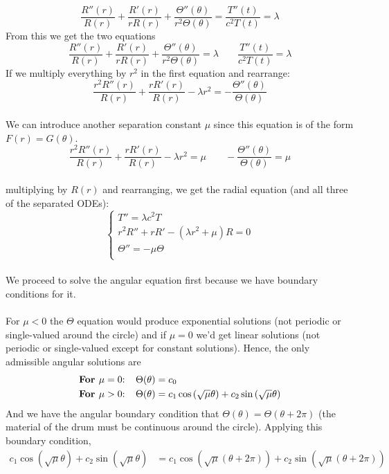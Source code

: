 \documentclass[12pt]{article}
\begin{document}
\begin{enumerate}[(a)]
{$$\frac{R''(r)}{R(r)} + \frac{R'(r)}{r R(r)} + \frac{\Theta''(\theta)}{r^2 \Theta(\theta)} = \frac{T''(t) }{c^2 T(t)} = \lambda$$
From this we get the two equations
$$\frac{R''(r)}{R(r)} + \frac{R'(r)}{r R(r)} + \frac{\Theta''(\theta)}{r^2 \Theta(\theta)}  = \lambda \;\;\;\;\;\;\; \frac{T''(t) }{c^2 T(t)} = \lambda$$
If we multiply everything by $r^2$ in the first equation and rearrange:
$$\frac{r^2R''(r)}{R(r)} + \frac{rR'(r)}{ R(r)} -  \lambda r^2  = -\frac{\Theta''(\theta)}{\Theta(\theta)} $$ \\
We can introduce another separation constant $\mu$ since this equation is of the form $F(r) = G(\theta)$.
$$\frac{r^2R''(r)}{R(r)} + \frac{rR'(r)}{ R(r)} -  \lambda r^2 = \mu  \;\;\;\;\;\;\; -\frac{\Theta''(\theta)}{\Theta(\theta)} = \mu $$ \\
multiplying by $R(r)$ and rearranging, we get the radial equation (and all three of the separated ODEs):
$$\begin{cases}
T'' = \lambda c^2 T \\
r^2 R'' + rR' -  (\lambda r^2 + \mu) R = 0 \\
\Theta'' = -\mu \Theta \\
\end{cases}$$ \\
We proceed to solve the angular equation first because we have boundary conditions for it. \\ \\
For $\mu < 0$ the $\Theta$ equation would produce exponential solutions (not periodic or single-valued around the circle) and if $\mu = 0$ we'd get linear solutions (not periodic or single-valued except for constant solutions). Hence, the only admissible angular solutions are \\
\begin{align*}
\text{\textbf{For $\mu = 0$}:} &\;\;\;\; \Theta(\theta) = c_0 \\
\text{\textbf{For $\mu > 0$}:} &\;\;\;\; \Theta(\theta) = c_1 \cos \left( \sqrt{\mu} \theta \right) + c_2 \sin \left( \sqrt{\mu} \theta \right) \\
\end{align*}
And we have the angular boundary condition that $\Theta(\theta) = \Theta(\theta + 2\pi)$ (the material of the drum must be continuous around the circle). Applying this boundary condition, \\
\begin{align*}
c_1 \cos \left( \sqrt{\mu} \theta \right) + c_2 \sin \left( \sqrt{\mu} \theta \right) &= c_1 \cos \left( \sqrt{\mu} (\theta + 2\pi) \right) + c_2 \sin \left( \sqrt{\mu} (\theta + 2\pi) \right) \\ \\

\end{align*}}
\end{enumerate}
\end{document}

